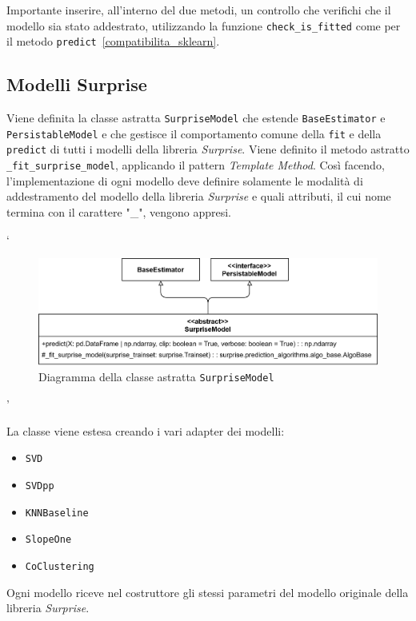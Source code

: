 Importante inserire, all'interno del due metodi, un controllo che verifichi che il modello sia stato addestrato, utilizzando la funzione \texttt{check\_is\_fitted} come per il metodo \texttt{predict}~\ref{compatibilita_sklearn}.

\subsection{Modelli Surprise}

Viene definita la classe astratta \texttt{SurpriseModel} che estende \texttt{BaseEstimator} e \texttt{PersistableModel} e che gestisce il comportamento comune della \texttt{fit} e della \texttt{predict} di tutti i modelli della libreria \textit{Surprise}. Viene definito il metodo astratto \texttt{\_fit\_surprise\_model}, applicando il pattern \textit{Template Method}. Così facendo, l'implementazione di ogni modello deve definire solamente le modalità di addestramento del modello della libreria \textit{Surprise} e quali attributi, il cui nome termina con il carattere "\_", vengono appresi.

`\begin{figure}[H]
    \centering
    \includegraphics[scale=0.17]{figures/UML/models/surprise_model.png}
    \caption{Diagramma della classe astratta \texttt{SurpriseModel}}
\end{figure}'


La classe viene estesa creando i vari adapter dei modelli:

\begin{itemize}
    \item \texttt{SVD}
    \item \texttt{SVDpp}
    \item \texttt{KNNBaseline}
    \item \texttt{SlopeOne}
    \item \texttt{CoClustering}
\end{itemize}

Ogni modello riceve nel costruttore gli stessi parametri del modello originale della libreria \textit{Surprise}.

